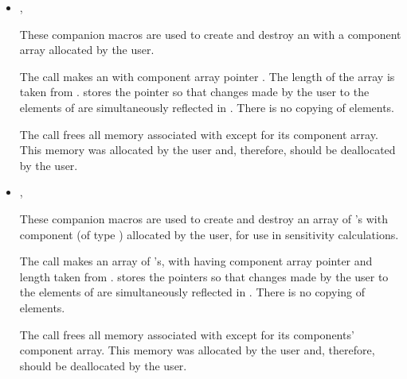 \begin{itemize}
\item {}, 

      These companion macros are used to create and          
      destroy an  with a component array  
      allocated by the user.                                   
                                                               
      The call  makes  an        
       with component array pointer . The length of the  
      array is taken from .                             
       stores the pointer  so that changes      
      made by the user to the elements of  are           
      simultaneously reflected in . There is no copying of    
      elements.                                                
                                                               
      The call  frees all memory associated     
      with  except for its component array. This memory was   
      allocated by the user and, therefore, should be          
      deallocated by the user.   

\item {}, 
                             
      These companion macros are used to create and destroy  
      an array of 's with component  
      (of type ) allocated by the user, for use in
      sensitivity calculations.

                                                               
      The call  makes   
       an array of  's, with  
      having component array pointer  and length taken from .    
       stores the pointers  so that        
      changes made by the user to the elements of  are  
      simultaneously reflected in . There is no copying of   
      elements.                                                
                                                               
      The call  frees all memory associated   
      with  except for its components' component array.      
      This memory was allocated by the user and, therefore,    
      should be deallocated by the user.                       

\end{itemize}

